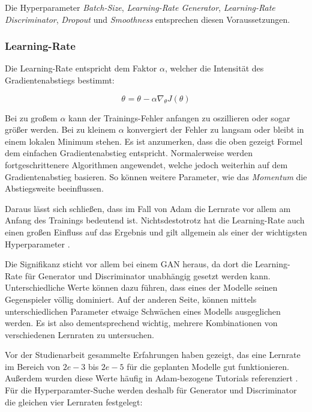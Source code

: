 Die Hyperparameter \textit{Batch-Size}, \textit{Learning-Rate Generator}, \textit{Learning-Rate Discriminator}, \textit{Dropout} und \textit{Smoothness} entsprechen diesen Voraussetzungen.

\subsubsection{Learning-Rate}
Die Learning-Rate entspricht dem Faktor \(\alpha\), welcher die Intensität des Gradientenabstiegs bestimmt:  

\[\theta_{}  =  \theta_{}  - \alpha   \nabla_{ \theta }  J( \theta )  \]

Bei zu großem \(\alpha\) kann der Trainings-Fehler anfangen zu oszillieren oder sogar größer werden.
Bei zu kleinem \(\alpha\) konvergiert der Fehler zu langsam oder bleibt in einem lokalen Minimum stehen. 
Es ist anzumerken, dass die oben gezeigt Formel dem einfachen Gradientenabstieg entspricht.
Normalerweise werden fortgeschrittenere Algorithmen angewendet, welche jedoch weiterhin auf dem Gradientenabstieg basieren.
So können weitere Parameter, wie das \textit{Momentum} die Abstiegsweite beeinflussen.
\newline

Daraus lässt sich schließen, dass im Fall von Adam die Lernrate vor allem am Anfang des Trainings bedeutend ist.
Nichtsdestotrotz hat die Learning-Rate auch einen großen Einfluss auf das Ergebnis und gilt allgemein als einer der wichtigsten Hyperparameter \cite[S. 447]{learning-rate-most-important}. 
\newline

Die Signifikanz sticht vor allem bei einem GAN heraus, da dort die Learning-Rate für Generator und Discriminator unabhängig gesetzt werden kann.
Unterschiedliche Werte können dazu führen, dass eines der Modelle seinen Gegenspieler völlig dominiert.
Auf der anderen Seite, können mittels unterschiedlichen Parameter etwaige Schwächen eines Modells ausgeglichen werden.
Es ist also dementsprechend wichtig, mehrere Kombinationen von verschiedenen Lernraten zu untersuchen.
\newline

Vor der Studienarbeit gesammelte Erfahrungen haben gezeigt, das eine Lernrate im Bereich von \(2e-3\) bis \(2e-5\) für die geplanten Modelle gut funktionieren.
Außerdem wurden diese Werte häufig in Adam-bezogene Tutorials referenziert \cite{adam-tutorial}.
Für die Hyperparamter-Suche werden deshalb für Generator und Discriminator die gleichen vier Lernraten festgelegt:

